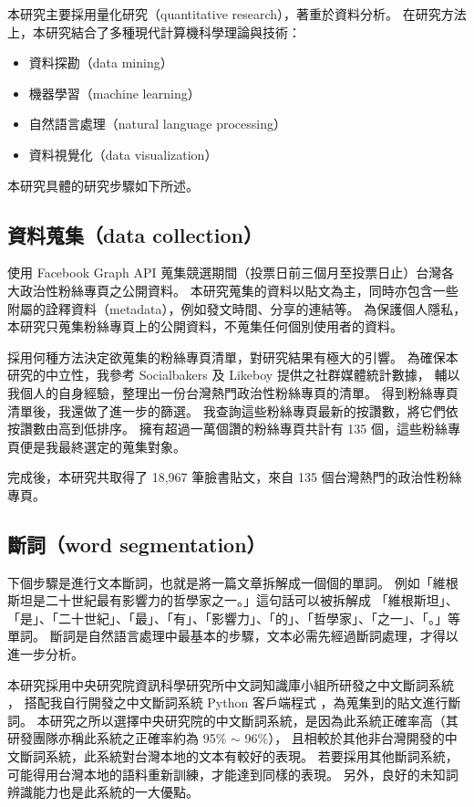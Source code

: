 \documentclass[letterpaper, 10pt, conference]{ieeeconf}   %
\begin{document}
\begin{CJK}{UTF8}{bsmi}
本研究主要採用量化研究（quantitative research），著重於資料分析。%
在研究方法上，本研究結合了多種現代計算機科學理論與技術：%
\begin{itemize}
\item 資料探勘（data mining）%
\item 機器學習（machine learning）%
\item 自然語言處理（natural language processing）%
\item 資料視覺化（data visualization）%
\end{itemize}

本研究具體的研究步驟如下所述。%

\subsection*{資料蒐集（data collection）}

使用 Facebook Graph API 蒐集競選期間（投票日前三個月至投票日止）台灣各大政治性粉絲專頁之公開資料。%
本研究蒐集的資料以貼文為主，同時亦包含一些附屬的詮釋資料（metadata），例如發文時間、分享的連結等。%
為保護個人隱私，本研究只蒐集粉絲專頁上的公開資料，不蒐集任何個別使用者的資料。%

採用何種方法決定欲蒐集的粉絲專頁清單，對研究結果有極大的引響。%
為確保本研究的中立性，我參考 Socialbakers \cite{c4} 及 Likeboy \cite{c5} 提供之社群媒體統計數據，%
輔以我個人的自身經驗，整理出一份台灣熱門政治性粉絲專頁的清單。%
得到粉絲專頁清單後，我還做了進一步的篩選。%
我查詢這些粉絲專頁最新的按讚數，將它們依按讚數由高到低排序。%
擁有超過一萬個讚的粉絲專頁共計有 135 個，這些粉絲專頁便是我最終選定的蒐集對象。%

完成後，本研究共取得了 18,967 筆臉書貼文，來自 135 個台灣熱門的政治性粉絲專頁。%

\subsection*{斷詞（word segmentation）}

下個步驟是進行文本斷詞，也就是將一篇文章拆解成一個個的單詞。%
例如「維根斯坦是二十世紀最有影響力的哲學家之一。」這句話可以被拆解成%
「維根斯坦」、「是」、「二十世紀」、「最」、「有」、「影響力」、「的」、「哲學家」、「之一」、「。」等單詞。%
斷詞是自然語言處理中最基本的步驟，文本必需先經過斷詞處理，才得以進一步分析。%

本研究採用中央研究院資訊科學研究所中文詞知識庫小組所研發之中文斷詞系統 \cite{c6}，%
搭配我自行開發之中文斷詞系統 Python 客戶端程式 \cite{c7}，為蒐集到的貼文進行斷詞。%
本研究之所以選擇中央研究院的中文斷詞系統，是因為此系統正確率高（其研發團隊亦稱此系統之正確率約為 95\% $\sim$ 96\%），%
且相較於其他非台灣開發的中文斷詞系統，此系統對台灣本地的文本有較好的表現。%
若要採用其他斷詞系統，可能得用台灣本地的語料重新訓練，才能達到同樣的表現。%
另外，良好的未知詞辨識能力也是此系統的一大優點。%


\end{CJK}
\end{document}

